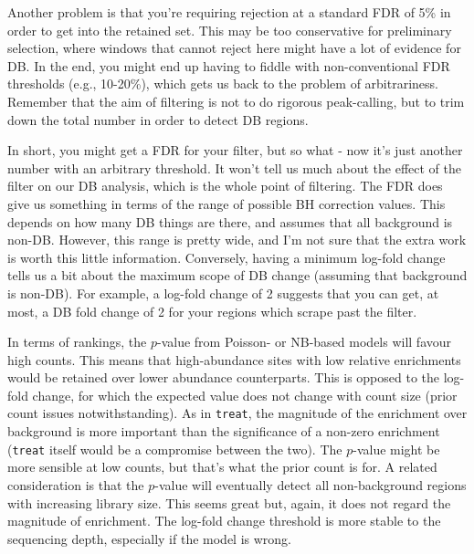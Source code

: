 \documentclass[12pt]{report}
\newcommand{\code}[1]{{\small\texttt{#1}}}
\begin{document}
Another problem is that you're requiring rejection at a standard FDR of 5\% in order to get into the retained set.
This may be too conservative for preliminary selection, where windows that cannot reject here might have a lot of evidence for DB.
In the end, you might end up having to fiddle with non-conventional FDR thresholds (e.g., 10-20\%), which gets us back to the problem of arbitrariness.
Remember that the aim of filtering is not to do rigorous peak-calling, but to trim down the total number in order to detect DB regions.

In short, you might get a FDR for your filter, but so what - now it's just another number with an arbitrary threshold.
It won't tell us much about the effect of the filter on our DB analysis, which is the whole point of filtering.
The FDR does give us something in terms of the range of possible BH correction values.
This depends on how many DB things are there, and assumes that all background is non-DB.
However, this range is pretty wide, and I'm not sure that the extra work is worth this little information.
Conversely, having a minimum log-fold change tells us a bit about the maximum scope of DB change (assuming that background is non-DB).
For example, a log-fold change of 2 suggests that you can get, at most, a DB fold change of 2 for your regions which scrape past the filter.

In terms of rankings, the $p$-value from Poisson- or NB-based models will favour high counts.
This means that high-abundance sites with low relative enrichments would be retained over lower abundance counterparts.
This is opposed to the log-fold change, for which the expected value does not change with count size (prior count issues notwithstanding).
As in \code{treat}, the magnitude of the enrichment over background is more important than the significance of a non-zero enrichment (\code{treat} itself would be a compromise between the two).
The $p$-value might be more sensible at low counts, but that's what the prior count is for.
A related consideration is that the $p$-value will eventually detect all non-background regions with increasing library size.
This seems great but, again, it does not regard the magnitude of enrichment. 
The log-fold change threshold is more stable to the sequencing depth, especially if the model is wrong.

\end{document}
